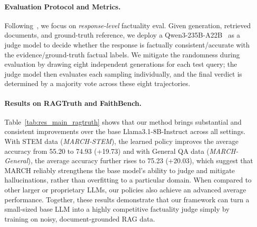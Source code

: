 \documentclass[10pt, a4paper, logo]{googledeepmind} %
\begin{document}
\paragraph{Evaluation Protocol and Metrics.}
Following~\citet{niu2024ragtruth,tamber2025benchmarking,jacovi2025facts,xu2025does}, we focus on \emph{response-level} factuality eval. Given generation, retrieved documents, and ground-truth reference, we deploy a Qwen3-235B-A22B~\citep{yang2025qwen3technicalreport} as a judge model to decide whether the response is factually consistent/accurate with the evidence/ground-truth factual labels. We mitigate the randomness during evaluation by drawing {eight} independent generations for each test query; the judge model then evaluates each sampling individually, and the final verdict is determined by a majority vote across these eight trajectories.


\paragraph{Results on RAGTruth and FaithBench.} Table~\ref{tab:res_main_ragtruth} shows that our method brings substantial and consistent improvements over the base Llama3.1-8B-Instruct across {all} settings. With STEM data (\textit{MARCH-STEM}), the learned policy improves the average accuracy from 55.20 to 74.93 ({+19.73}) and with General QA data (\textit{MARCH-General}), the average accuracy further rises to 75.23 ({+20.03}), which suggest that MARCH reliably strengthens the base model’s ability to judge and mitigate hallucinations, rather than overfitting to a particular domain. When compared to other larger or proprietary LLMs, our policies also achieve an advanced average performance. Together, these results demonstrate that our framework can turn a small-sized base LLM into a highly competitive factuality judge simply by training on noisy, document-grounded RAG data.
\end{document}
